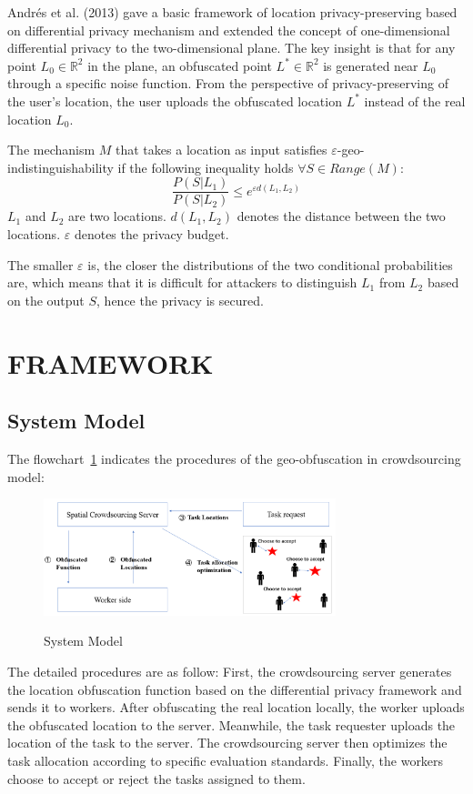 Andrés et al. (2013) gave a basic framework of location privacy-preserving based on differential privacy mechanism and extended the concept of one-dimensional differential privacy to the two-dimensional plane. The key insight is that for any point $L_0 \in \mathbb R^2$ in the plane, an obfuscated point $L^* \in \mathbb R^2$ is generated near $L_0$ through a specific noise function. From the perspective of privacy-preserving of the user's location, the user uploads the obfuscated location $L^*$ instead of the real location $L_0$.

\begin{definition}
	The mechanism $M$ that takes a location as input satisfies $\varepsilon$-geo-indistinguishability if the following inequality holds $\forall S \in Range(M)$: 
	$$
	\frac{P(S|L_1)}{P(S|L_2)} \leq e^{\varepsilon d(L_1,L_2)}
	$$
	$L_1$ and $L_2$ are two locations. $d(L_1,L_2)$ denotes the distance between the two locations. $\varepsilon$ denotes the privacy budget. 
\end{definition}
 The smaller $\varepsilon$ is, the closer the distributions of the two conditional probabilities are, which means that it is difficult for attackers to distinguish $L_1$ from $L_2$ based on the output $S$, hence the privacy is secured.

\section{FRAMEWORK}
\subsection{System Model}
The flowchart~\ref{img:SysModel} indicates the procedures of the geo-obfuscation in crowdsourcing model:

\begin{figure}
\includegraphics[width=8.5cm]{SysModel}
\label{img:SysModel}
\caption{System Model}
\end{figure}

The detailed procedures are as follow:
First, the crowdsourcing server generates the location obfuscation function based on the differential privacy framework and sends it to workers. After obfuscating the real location locally, the worker uploads the obfuscated location to the server. Meanwhile, the task requester uploads the location of the task to the server. The crowdsourcing server then optimizes the task allocation according to specific evaluation standards. Finally, the workers choose to accept or reject the tasks assigned to them.

